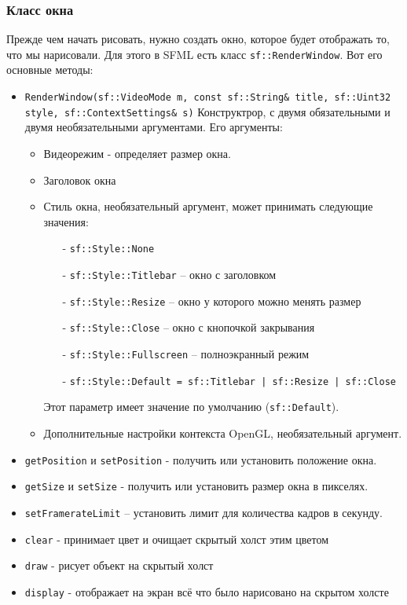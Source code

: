 \documentclass{article}
\begin{document}
\subsubsection*{Класс окна}
Прежде чем начать рисовать, нужно создать окно, которое будет отображать то, что мы нарисовали. Для этого в SFML есть класс \texttt{sf::RenderWindow}. Вот его основные методы:
\begin{itemize}
\item \texttt{RenderWindow(sf::VideoMode m, const sf::String\& title, sf::Uint32 style, sf::ContextSettings\& s)}
Конструктрор, с двумя обязательными и двумя необязательными аргументами. Его аргументы:
\begin{itemize}
\item Видеорежим - определяет размер окна.
\item Заголовок окна
\item Стиль окна, необязательный аргумент, может принимать следующие значения:
\begin{itemize}
\item[-] \texttt{sf::Style::None}
\item[-] \texttt{sf::Style::Titlebar} -- окно с заголовком
\item[-] \texttt{sf::Style::Resize}  -- окно у которого можно менять размер
\item[-] \texttt{sf::Style::Close} -- окно с кнопочкой закрывания
\item[-] \texttt{sf::Style::Fullscreen} -- полноэкранный режим
\item[-] \texttt{sf::Style::Default = sf::Titlebar | sf::Resize | sf::Close} 
\end{itemize}
Этот параметр имеет значение по умолчанию (\texttt{sf::Default}).

\item Дополнительные настройки контекста OpenGL, необязательный аргумент.
\end{itemize}

\item \texttt{getPosition} и \texttt{setPosition} - получить или установить положение окна.
\item \texttt{getSize} и \texttt{setSize} - получить или установить размер окна в пикселях.
\item \texttt{setFramerateLimit} -- установить лимит для количества кадров в секунду.
\item \texttt{clear} - принимает цвет и очищает скрытый холст этим цветом
\item \texttt{draw} - рисует объект на скрытый холст
\item \texttt{display} - отображает на экран всё что было нарисовано на скрытом холсте
\end{itemize}
\end{document}
